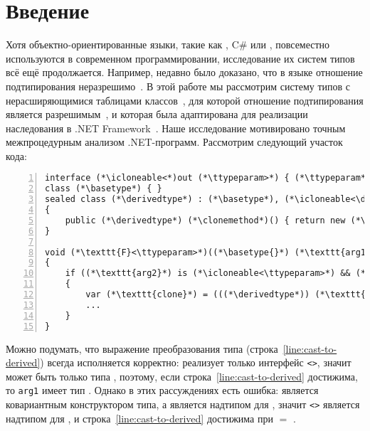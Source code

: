 \section{Введение}

Хотя объектно-ориентированные языки, такие как \java, C\# или \scala, повсеместно используются в современном программировании, исследование их систем типов всё ещё продолжается. Например, недавно было доказано, что в языке \java отношение подтипирования неразрешимо~\cite{grigore2017java}. В этой работе мы рассмотрим систему типов с нерасширяющимися таблицами классов~\cite{viroli2000recursive}, для которой отношение подтипирования является разрешимым~\cite{kennedy2006decidability}, и которая была адаптирована для реализации наследования в .NET Framework~\cite{ecma2005335}. Наше исследование мотивировано точным межпроцедурным анализом .NET-программ.
Рассмотрим следующий участок кода:
\begin{lstlisting}[basicstyle=\small,numbers=left]
interface (*\icloneable<*)out (*\ttypeparam>*) { (*\ttypeparam*) (*\clonemethod*)(); }
class (*\basetype*) { }
sealed class (*\derivedtype*) : (*\basetype*), (*\icloneable<\derivedtype>*)
{
    public (*\derivedtype*) (*\clonemethod*)() { return new (*\derivedtype*)(); }
}

void (*\texttt{F}<\ttypeparam>*)((*\basetype{}*) (*\texttt{arg1}*), (*\derivedtype*) (*\texttt{arg2}*))
{
    if ((*\texttt{arg2}*) is (*\icloneable<\ttypeparam>*) && (*\texttt{arg1}*) is (*\ttypeparam*))
    {
        var (*\texttt{clone}*) = (((*\derivedtype*)) (*\texttt{arg1}*)).(*\clonemethod*)();(*\label{line:cast-to-derived}*)
        ...
    }
}
\end{lstlisting}
Можно подумать, что выражение преобразования типа (строка~\ref{line:cast-to-derived}) всегда исполняется корректно: \derivedtype{} реализует только интерфейс \icloneable\texttt{<}\derivedtype\texttt{>}, значит \ttypeparam{} может быть только типа \derivedtype{}, поэтому, если строка~\ref{line:cast-to-derived} достижима, то \texttt{arg1} имеет тип \derivedtype. Однако в этих рассуждениях есть ошибка: \icloneable{} является ковариантным конструктором типа, а \basetype{} является надтипом для \derivedtype{}, значит \icloneable\texttt{<}\basetype\texttt{>} является надтипом для \derivedtype{}, и строка~\ref{line:cast-to-derived} достижима при \ttypeparam{} $=$ \basetype{}.

